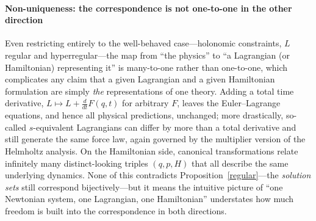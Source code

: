 \paragraph{Non-uniqueness: the correspondence is not one-to-one in the other direction}
Even restricting entirely to the well-behaved case---holonomic constraints, $L$
regular and hyperregular---the map from ``the physics'' to ``a Lagrangian (or
Hamiltonian) representing it'' is many-to-one rather than one-to-one, which
complicates any claim that a given Lagrangian and a given Hamiltonian
formulation are simply \emph{the} representations of one theory. Adding a total
time derivative, $L \mapsto L + \frac{d}{dt}F(q,t)$ for arbitrary $F$, leaves
the Euler--Lagrange equations, and hence all physical predictions, unchanged;
more drastically, so-called $s$-equivalent Lagrangians can differ by more than
a total derivative and still generate the same force law, again governed by the
multiplier version of the Helmholtz analysis. On
the Hamiltonian side, canonical transformations relate infinitely many
distinct-looking triples $(q,p,H)$ that all describe the same underlying
dynamics. None of this contradicts Proposition~\ref{regular}---the
\emph{solution sets} still correspond bijectively---but it means the intuitive
picture of ``one Newtonian system, one Lagrangian, one Hamiltonian''
understates how much freedom is built into the correspondence in both
directions.







